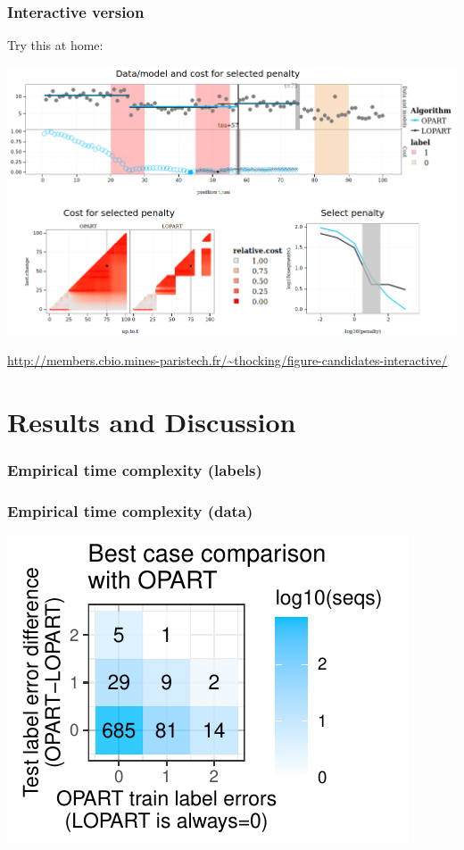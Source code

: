 \documentclass{beamer}
\begin{document}
\begin{frame}
  \frametitle{Interactive version}
  Try this at home:

  \includegraphics[width=\textwidth]{screenshot-LOPART-interactive}

  \url{http://members.cbio.mines-paristech.fr/~thocking/figure-candidates-interactive/}
\end{frame}

\section{Results and Discussion}

\begin{frame}
  \frametitle{Empirical time complexity (labels)}
  
\end{frame}

\begin{frame}
  \frametitle{Empirical time complexity (data)}
  
\end{frame}

\begin{frame}
  \includegraphics[width=\textwidth]{figure-label-errors}
\end{frame}
\end{document}

